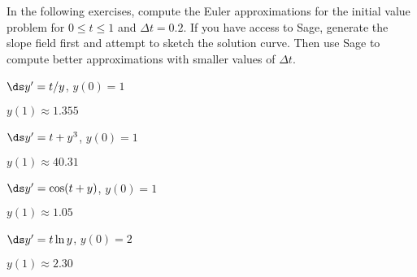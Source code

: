 \begin{enumialphparenastyle}

In the following exercises, compute the Euler approximations for the initial
value problem for $0\le t\le 1$ and $\Delta t=0.2$. If you have access
to Sage, generate the slope field first and attempt to sketch the
solution curve. Then use Sage to compute better approximations with
smaller values of $\Delta t$.

\begin{ex}
 $\ds y'=t/y$, $y(0)=1$
\begin{sol}
 $y(1)\approx 1.355$
\end{sol}
\end{ex}


\begin{ex}
 $\ds y'=t+y^3$, $y(0)=1$
\begin{sol}
 $y(1)\approx 40.31$
\end{sol}
\end{ex}


\begin{ex}
 $\ds y'=\cos(t+y)$, $y(0)=1$
\begin{sol}
 $y(1)\approx 1.05$
\end{sol}
\end{ex}


\begin{ex}
 $\ds y'=t\ln y$, $y(0)=2$
\begin{sol}
 $y(1)\approx 2.30$
\end{sol}
\end{ex}

\end{enumialphparenastyle}